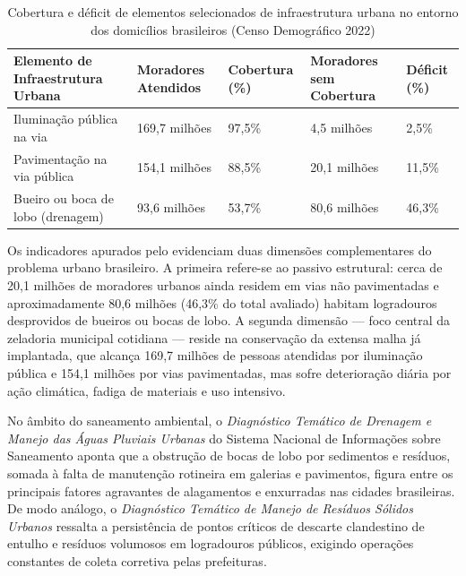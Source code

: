 \begin{table}[htb]
\ABNTEXfontereduzida
\caption{Cobertura e déficit de elementos selecionados de infraestrutura urbana no entorno dos domicílios brasileiros (Censo Demográfico 2022)}
\label{tab:infraestrutura-censo2022}
\centering
\begin{tabular}{L{5.1cm} R{2.4cm} R{1.9cm} R{2.6cm} R{1.8cm}}
\toprule
\textbf{Elemento de Infraestrutura Urbana} & \textbf{Moradores Atendidos} & \textbf{Cobertura (\%)} & \textbf{Moradores sem Cobertura} & \textbf{Déficit (\%)} \\
\midrule
Iluminação pública na via & 169,7 milhões & 97,5\% & 4,5 milhões & 2,5\% \\
Pavimentação na via pública & 154,1 milhões & 88,5\% & 20,1 milhões & 11,5\% \\
Bueiro ou boca de lobo (drenagem) & 93,6 milhões & 53,7\% & 80,6 milhões & 46,3\% \\
\bottomrule
\end{tabular}
\end{table}

Os indicadores apurados pelo  evidenciam duas dimensões complementares do problema urbano brasileiro. A primeira refere-se ao passivo estrutural: cerca de 20,1 milhões de moradores urbanos ainda residem em vias não pavimentadas e aproximadamente 80,6 milhões (46,3\% do total avaliado) habitam logradouros desprovidos de bueiros ou bocas de lobo. A segunda dimensão --- foco central da zeladoria municipal cotidiana --- reside na conservação da extensa malha já implantada, que alcança 169,7 milhões de pessoas atendidas por iluminação pública e 154,1 milhões por vias pavimentadas, mas sofre deterioração diária por ação climática, fadiga de materiais e uso intensivo.

No âmbito do saneamento ambiental, o \emph{Diagnóstico Temático de Drenagem e Manejo das Águas Pluviais Urbanas} do Sistema Nacional de Informações sobre Saneamento \cite{snis2023drenagem} aponta que a obstrução de bocas de lobo por sedimentos e resíduos, somada à falta de manutenção rotineira em galerias e pavimentos, figura entre os principais fatores agravantes de alagamentos e enxurradas nas cidades brasileiras. De modo análogo, o \emph{Diagnóstico Temático de Manejo de Resíduos Sólidos Urbanos} \cite{snis2023residuos} ressalta a persistência de pontos críticos de descarte clandestino de entulho e resíduos volumosos em logradouros públicos, exigindo operações constantes de coleta corretiva pelas prefeituras.

